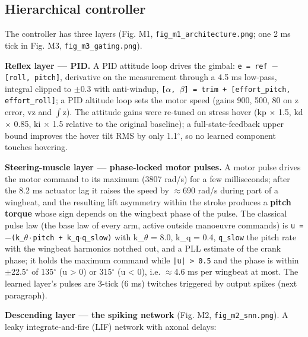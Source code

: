 \documentclass[10pt,a4paper]{article}
\begin{document}
\subsection{Hierarchical controller}

The controller has three layers (Fig. M1, \texttt{fig\_m1\_architecture.png}; one 2 ms tick in Fig. M3, \texttt{fig\_m3\_gating.png}).

\textbf{Reflex layer --- PID.} A PID attitude loop drives the gimbal: \texttt{e = ref $-$ [roll, pitch]}, derivative on the measurement through a 4.5 ms low-pass, integral clipped to $\pm$0.3 with anti-windup, \texttt{[$\alpha$, $\beta$] = trim + [effort\_pitch, effort\_roll]}; a PID altitude loop sets the motor speed (gains 900, 500, 80 on z error, vz and $\int$z). The attitude gains were re-tuned on stress hover (kp $\times$ 1.5, kd $\times$ 0.85, ki $\times$ 1.5 relative to the original baseline); a full-state-feedback upper bound improves the hover tilt RMS by only 1.1$^\circ$, so no learned component touches hovering.

\textbf{Steering-muscle layer --- phase-locked motor pulses.} A motor pulse drives the motor command to its maximum (3807 rad/s) for a few milliseconds; after the 8.2 ms actuator lag it raises the speed by $\approx$690 rad/s during part of a wingbeat, and the resulting lift asymmetry within the stroke produces a \textbf{pitch torque} whose sign depends on the wingbeat phase of the pulse. The classical pulse law (the base law of every arm, active outside manoeuvre commands) is \texttt{u = $-$(k\_$\theta\cdot$pitch + k\_q$\cdot$q\_slow)} with k\_$\theta$ = 8.0, k\_q = 0.4, \texttt{q\_slow} the pitch rate with the wingbeat harmonics notched out, and a PLL estimate of the crank phase; it holds the maximum command while \texttt{|u| > 0.5} and the phase is within $\pm$22.5$^\circ$ of 135$^\circ$ (u > 0) or 315$^\circ$ (u < 0), i.e. $\approx$4.6 ms per wingbeat at most. The learned layer's pulses are 3-tick (6 ms) twitches triggered by output spikes (next paragraph).

\textbf{Descending layer --- the spiking network} (Fig. M2, \texttt{fig\_m2\_snn.png}). A leaky integrate-and-fire (LIF) network with axonal delays:
\end{document}
